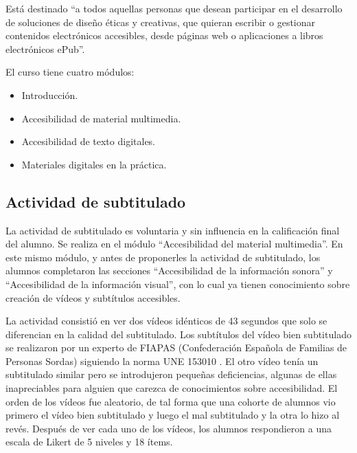 \documentclass[
  12pt,
  a4paper,
  extrafontsizes,
  onecolumn,
  openright,
  table]{memoir}
\providecommand{\tightlist}{%
  \setlength{\itemsep}{0pt}\setlength{\parskip}{0pt}}\usepackage{longtable,booktabs,array}
\begin{document}
Está destinado \enquote{a todos aquellas personas que desean participar
en el desarrollo de soluciones de diseño éticas y creativas, que quieran
escribir o gestionar contenidos electrónicos accesibles, desde páginas
web o aplicaciones a libros electrónicos ePub}.

El curso tiene cuatro módulos:

\begin{itemize}
\tightlist
\item
  Introducción.
\item
  Accesibilidad de material multimedia.
\item
  Accesibilidad de texto digitales.
\item
  Materiales digitales en la práctica.
\end{itemize}

\hypertarget{actividad-de-subtitulado}{%
\subsection{Actividad de subtitulado}\label{actividad-de-subtitulado}}

La actividad de subtitulado es voluntaria y sin influencia en la
calificación final del alumno. Se realiza en el módulo
\enquote{Accesibilidad del material multimedia}. En este mismo módulo, y
antes de proponerles la actividad de subtitulado, los alumnos
completaron las secciones \enquote{Accesibilidad de la información
sonora} y \enquote{Accesibilidad de la información visual}, con lo cual
ya tienen conocimiento sobre creación de vídeos y subtítulos accesibles.

La actividad consistió en ver dos vídeos idénticos de 43 segundos que
solo se diferencian en la calidad del subtitulado. Los subtítulos del
vídeo bien subtitulado se realizaron por un experto de FIAPAS
(Confederación Española de Familias de Personas Sordas) siguiendo la
norma UNE 153010 \autocite[ver][]{jperez1}. El otro vídeo tenía un
subtitulado similar pero se introdujeron pequeñas deficiencias, algunas
de ellas inapreciables para alguien que carezca de conocimientos sobre
accesibilidad. El orden de los vídeos fue aleatorio, de tal forma que
una cohorte de alumnos vio primero el vídeo bien subtitulado y luego el
mal subtitulado y la otra lo hizo al revés. Después de ver cada uno de
los vídeos, los alumnos respondieron a una escala de Likert de 5 niveles
y 18 ítems.
\end{document}
